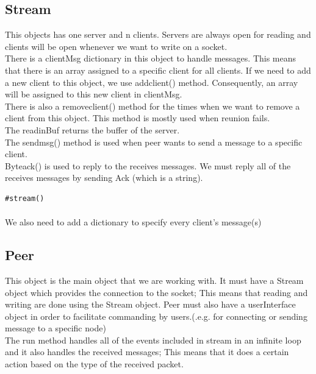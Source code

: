 \documentclass{article}
\begin{document}
\subsection{Stream}This objects has one server and n clients. Servers are always open for reading and clients will be open whenever we want to write on a socket. \\
There is a clientMsg dictionary in this object to handle messages. This means that there is an array assigned to a specific client for all clients. If we need to add a new client to this object, we use add\underline{\hspace{.05in}}client() method. Consequently, an array will be assigned to this new client in clientMsg.\\
There is also a remove\underline{\hspace{.05in}}client() method for the times when we want to remove a client from this object. This method is mostly used  when reunion fails.\\
The read\underline{\hspace{.05in}}inBuf returns the buffer of the server.\\
The send\underline{\hspace{.05in}}msg() method is used when peer wants to send a message to a specific client.\\
Byte\underline{\hspace{.05in}}ack() is used to reply to the receives messages. We must reply all of the receives messages by sending Ack (which is a string).\\
\begin{lstlisting}
#stream()

\end{lstlisting}
\paragraph{}We also need to add a dictionary to specify every client's message(s)
\subsection{Peer}This object is the main object that we are working with. It must have a Stream object which provides the connection to the socket; This means that reading and writing are done using the Stream object. Peer must also have a userInterface object in order to facilitate commanding by users.(.e.g. for connecting or sending message to a specific node)\\
The run method handles all of the events included in stream in an infinite loop and it also handles the received messages; This means that it does a certain action based on the type of the received packet.
\end{document}
